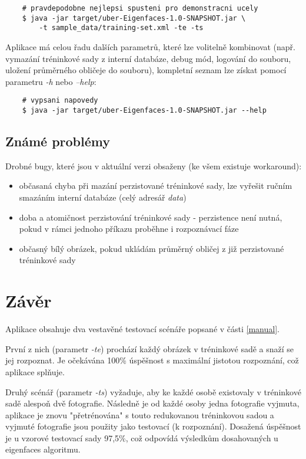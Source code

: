 \documentclass[10pt,a4paper]{article}
\begin{document}
	\begin{verbatim}
	# pravdepodobne nejlepsi spusteni pro demonstracni ucely	
	$ java -jar target/uber-Eigenfaces-1.0-SNAPSHOT.jar \
		-t sample_data/training-set.xml -te -ts 
	\end{verbatim}

Aplikace má celou řadu dalších parametrů, které lze volitelně kombinovat (např. vymazání tréninkové sady z interní databáze, debug mód, logování do souboru, uložení průměrného obličeje do souboru), kompletní seznam lze získat pomocí parametru \textit{-h} nebo \textit{--help}:
    
    \begin{verbatim}
    # vypsani napovedy
    $ java -jar target/uber-Eigenfaces-1.0-SNAPSHOT.jar --help
	\end{verbatim}

\subsection{Známé problémy}

Drobné bugy, které jsou v aktuální verzi obsaženy (ke všem existuje workaround):

\begin{itemize}
	\item občasaná chyba při mazání perzistované tréninkové sady, lze vyřešit ručním smazáním interní databáze (celý adresář \textit{data})
	\item doba a atomičnost perzistování tréninkové sady - perzistence není nutná, pokud v rámci jednoho příkazu proběhne i rozpoznávací fáze
	\item občasný bílý obrázek, pokud ukládám průměrný obličej z již perzistované tréninkové sady
\end{itemize}

\section{Závěr}

Aplikace obsahuje dva vestavěné testovací scénáře popsané v části \ref{manual}. 

První z nich (parametr \textit{-te}) prochází každý obrázek v tréninkové sadě a snaží se jej rozpoznat. Je očekávána 100\% úspěšnost s maximální jistotou rozpoznání, což aplikace splňuje.

Druhý scénář (parametr \textit{-ts}) vyžaduje, aby ke každé osobě existovaly v tréninkové sadě alespoň dvě fotografie. Následně je od každé osoby jedna fotografie vyjmuta, aplikace je znovu "přetrénována" s touto redukovanou tréninkovou sadou a vyjmuté fotografie jsou použity jako testovací (k rozpoznání). Dosažená úspěšnost je u vzorové testovací sady 97,5\%, což odpovídá výsledkům dosahovaných u eigenfaces algoritmu\cite{jafri}.
\end{document}
